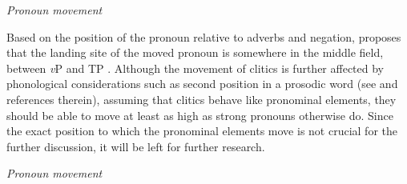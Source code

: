 \documentclass[output=paper,colorlinks,citecolor=brown]{langscibook}
\begin{document}
\ea \textit{Pronoun movement} 
\label{footnote} 
\label{pronounmovementb} 
\label{pronounmovementc}
\z \z

\noindent Based on the position of the pronoun relative to adverbs and negation, \citet{beslinNPDP} proposes that the landing site of the moved pronoun is somewhere in the middle field, between \textit{v}P and TP . Although the movement of clitics is further affected by phonological considerations such as second position in a prosodic word (see \citealt{talic18} and references therein), assuming that clitics behave like pronominal elements, they should be able to move at least as high as strong pronouns otherwise do. Since the exact position to which the pronominal elements move is not crucial for the further discussion, it will be left for further research. 

\ea \textit{Pronoun movement}
\label{landingsiteb}
\z \z
\end{document}
